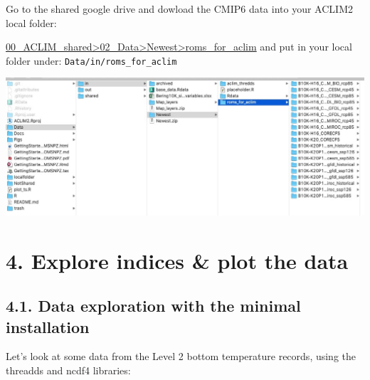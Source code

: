 \documentclass[
]{article}
\begin{document}
Go to the shared google drive and dowload the CMIP6 data into your
ACLIM2 local folder:

\href{https://drive.google.com/drive/folders/1ljACM6cgMD7M14lzvozZyTP4tMBnf_S4}{00\_ACLIM\_shared\textgreater02\_Data\textgreater Newest\textgreater roms\_for\_aclim}
and put in your local folder under: \texttt{Data/in/roms\_for\_aclim}

\includegraphics{Figs/filestructure2.jpg}

\hypertarget{explore-indices-plot-the-data}{%
\section{4. Explore indices \& plot the
data}\label{explore-indices-plot-the-data}}

\hypertarget{data-exploration-with-the-minimal-installation}{%
\subsection{4.1. Data exploration with the minimal
installation}\label{data-exploration-with-the-minimal-installation}}

Let's look at some data from the Level 2 bottom temperature records,
using the threadds and ncdf4 libraries:
\end{document}
